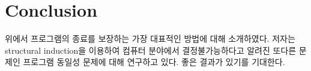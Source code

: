 \section{Conclusion}
\label{sec:conclusion}
위에서 프로그램의 종료를 보장하는 가장 대표적인 방법에 대해 소개하였다.
저자는 structural induction을 이용하여 컴퓨터 분야에서 결정불가능하다고 알려진 또다른 문제인
프로그램 동일성 문제에 대해 연구하고 있다.
좋은 결과가 있기를 기대한다.